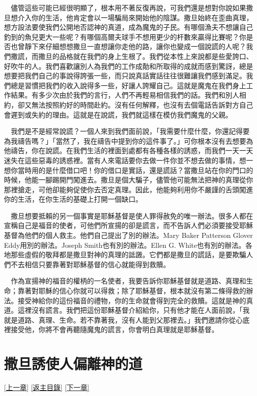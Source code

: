 \documentclass{book}
\begin{document}
　儘管這些可能已經很明顯了，根本用不著反復再說，可我們還是想對你說如果撒旦想介入你的生活，他肯定會以一場騙局來開始他的陰謀。撒旦始終在歪曲真理，想方設法要使我們公開地否認神的真道，成為魔鬼的子民。有哪個漁夫不想讓自己釣到的魚兒更大一些呢？有哪個高爾夫球手不想用更少的杆數來贏得比賽呢？你是否也曾靜下來仔細想想撒旦一直想讓你走他的路，讓你也變成一個說謊的人呢？我們撒謊，而撒旦的品格就在我們的身上生根了。我們從本性上來說都是些愛誇口、好吹牛的人。我們喜歡讓別人為我們的工作成勣和所取得的成就而感到驚訝，總是想要把我們自己的事說得誇張一些，而只說真話實話往往很難讓我們感到滿足。我們總是習慣把我們的收入說得多一些，好讓人誇耀自己。這就是魔鬼在我們身上工作結果。有多少次由於我們的言行，人們不再輕易相信我們的話。我們和別人相約，卻又無法按照約好的時間赴約。沒有任何解釋，也沒有去個電話告訴對方自己會遲到或失約的理由。這就是在說謊，我們就這樣在模仿我們魔鬼的父親。

　我們是不是經常說謊？一個人來到我們面前說，「我需要什麼什麼，你還記得要為我禱告嗎？」「當然了，我在禱告中提到你的這件事了。」可你根本沒有去想要為他禱告，你在說謊。在我們生活的裡面到處都有各種各樣的誘惑，而我們一天一天迷失在這些惡毒的誘惑裡。當有人來電話要你去做一件你並不想去做的事情，想一想你當時用的是什麼借口吧！你的借口是實話，還是謊話？當撒旦站在你的門口的時候，他能一腳踢開門闖進去。撒旦是個大騙子，儘管他可能無法把神的真理從你那裡搶走，可他卻能夠促使你去否定真理。因此，他能夠利用你不嚴謹的舌頭闖進你的生活，在你生活的基礎上打開一個缺口。

　撒旦想要抵賴的另一個事實是耶穌基督是使人罪得赦免的唯一辦法。很多人都在宣稱自己是福音的使者，可他們所宣揚的卻是謊言，而不告訴人們必須要接受耶穌基督為他們的個人救主。他們自己提出了別的辦法。Mary Baker Patterson Glover Eddy用別的辦法。Joseph Smith也有別的辦法。Ellen G. White也有別的辦法。各地那些虛假的敬拜都是撒旦對神的真理的詆譭。它們都是撒旦的謊話，是要欺騙人們不去相信只要靠著對耶穌基督的信心就能得到救贖。

　作為宣揚神的福音的權柄的一名使者，我要告訴你耶穌基督就是道路、真理和生命；靠著對耶穌的信心你就可以得救；除了耶穌基督，根本就沒有第二條得救的辦法。接受神給你的這份福音的禮物，你的生命就會得到完全的救贖。這就是神的真道。這裡沒有謊言。我們把這份耶穌基督介紹給你，只有他才能在人面前說，「我就是道路、真理、生命。若不靠著我，沒有人能到父那裡去。」我們邀請你從心底裡接受他，你將不會再聽隨魔鬼的謊言，你會明白真理就是耶穌基督。

\chapter{撒旦誘使人偏離神的道}
\label{sec:ch06}
\hyperref[sec:ch05]{[上一章]}
\hyperlink{toc}{[返主目錄]}
\hyperref[sec:ch07]{[下一章]}
\end{document}
